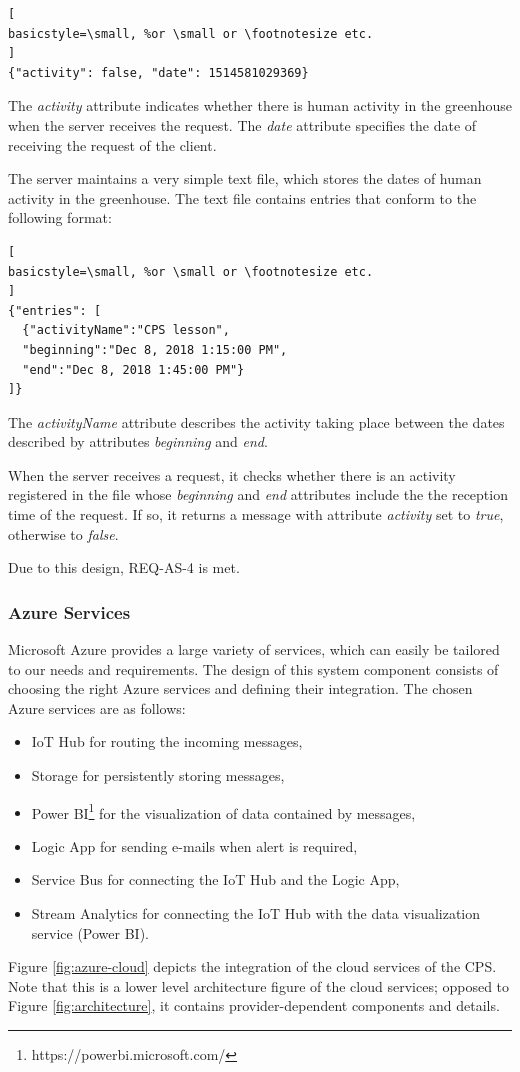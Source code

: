 \documentclass[a4paper, 11pt]{article}
\begin{document}
	\begin{lstlisting}[
basicstyle=\small, %or \small or \footnotesize etc.
]
{"activity": false, "date": 1514581029369}
	\end{lstlisting}

	The \textsl{activity} attribute indicates whether there is human activity in the greenhouse when the server receives the request. The \textsl{date} attribute specifies the date of receiving the request of the client.

	The server maintains a very simple text file, which stores the dates of human activity in the greenhouse. The text file contains entries that conform to the following format:
	\begin{lstlisting}[
basicstyle=\small, %or \small or \footnotesize etc.
]
{"entries": [
  {"activityName":"CPS lesson",
  "beginning":"Dec 8, 2018 1:15:00 PM",
  "end":"Dec 8, 2018 1:45:00 PM"}
]}
\end{lstlisting}
	The \textsl{activityName} attribute describes the activity taking place between the dates described by attributes \textsl{beginning} and \textsl{end}.

	When the server receives a request, it checks whether there is an activity registered in the file whose \textsl{beginning} and \textsl{end} attributes include the the reception time of the request. If so, it returns a message with attribute \textsl{activity} set to \emph{true}, otherwise to \emph{false}.
	
	Due to this design, REQ-AS-4 is met.
	
	\subsubsection{Azure Services}
	
	Microsoft Azure provides a large variety of services, which can easily be tailored to our needs and requirements. The design of this system component consists of choosing the right Azure services and defining their integration. The chosen Azure services are as follows:
	\begin{itemize}
		\item IoT Hub for routing the incoming messages,
		\item Storage for persistently storing messages,
		\item Power BI\footnote{https://powerbi.microsoft.com/} for the visualization of data contained by messages,
		\item Logic App for sending e-mails when alert is required,
		\item Service Bus for connecting the IoT Hub and the Logic App,
		\item Stream Analytics for connecting the IoT Hub with the data visualization service (Power BI).
	\end{itemize}
	Figure \ref{fig:azure-cloud} depicts the integration of the cloud services of the CPS. Note that this is a lower level architecture figure of the cloud services; opposed to Figure \ref{fig:architecture}, it contains provider-dependent components and details.
		
\end{document}
